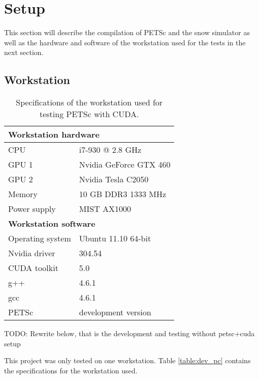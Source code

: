 \section{Setup}

This section will describe the compilation of PETSc and the snow simulator as well 
as the hardware and software of the workstation used for the tests in the next section. 

\subsection{Workstation}


\begin{table}[h]
	\begin{center}
	\bgroup
	\def\arraystretch{1.2}
	\begin{tabular}{|l|l|}
		\hline
		\multicolumn{2}{|l|}{\textbf{Workstation hardware}} \\ \hline
		CPU & i7-930 @ 2.8 GHz \\ \hline
		GPU 1 & Nvidia GeForce GTX 460 \\ \hline
		GPU 2 & Nvidia Tesla C2050 \\ \hline
		Memory & 10 GB DDR3 1333 MHz \\ \hline
		Power supply & MIST AX1000 \\ \hline
		\multicolumn{2}{|l|}{\textbf{Workstation software}} \\ \hline
		Operating system & Ubuntu 11.10 64-bit \\ \hline
		Nvidia driver & 304.54 \\ \hline
		CUDA toolkit & 5.0 \\ \hline
		g++ & 4.6.1 \\ \hline
		gcc & 4.6.1 \\ \hline
		PETSc & development version \\ \hline
	\end{tabular}
	\egroup
	\end{center}
	\caption{Specifications of the workstation used for testing PETSc with CUDA.}
	\label{table:test_pc}
\end{table}

TODO: Rewrite below, that is the development and testing without petsc+cuda setup

This project was only tested on one workstation. Table \ref{table:dev_pc} contains 
the specifications for the workstation used.

